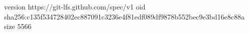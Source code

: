 version https://git-lfs.github.com/spec/v1
oid sha256:c135f534728402ec887091c3236e4f81edf089df9878b552bec9e3bd16e8c88a
size 5566
